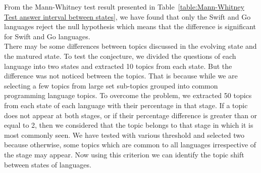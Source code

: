 From the Mann-Whitney test result presented in Table~\ref{table:Mann-Whitney Test answer interval between states}, we have found that only the Swift and Go languages reject the null hypothesis which means that the difference is significant for Swift and Go languages.\\
There may be some differences between topics discussed in the evolving state and the matured state. To test the conjecture, we divided the questions of each language into two states and extracted 10 topics from each state. But the difference was not noticed between the topics. That is because while we are selecting a few topics from large set sub-topics grouped into common programming language topics. To overcome the problem, we extracted 50 topics from each state of each language with their percentage in that stage. If a topic does not appear at both stages, or if their percentage difference is greater than or equal to 2, then we considered that the topic belongs to that stage in which it is most commonly seen. We have tested with various threshold and selected two because otherwise, some topics which are common to all languages irrespective of the stage may appear. Now using this criterion we can identify the topic shift between states of languages.
